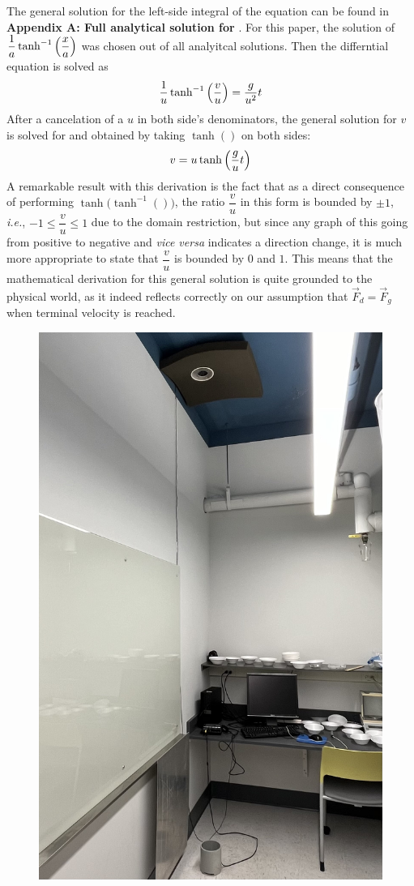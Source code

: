 \documentclass[12pt]{article}
\newcommand{\diff}[1]{\text{d}#1}
\newcommand{\dragforce}{\vec{F}_d}
\newcommand{\forceofgravity}{\vec{F}_g}
\newcommand{\inversetanh}{\tanh^{-1}}
\begin{document}
\begin{multicols}{2}
The general solution for the left-side integral of the equation can be found in \textbf{Appendix A: Full analytical solution for \bm{$\int\frac{1}{a^2-x^2}\diff{x}$}}.
For this paper, the solution of $\dfrac{1}{a}\inversetanh\qty(\dfrac{x}{a})$ was chosen out of all analyitcal solutions.
Then the differntial equation is solved as
$$\frac{1}{u}\inversetanh\qty(\frac{v}{u})=\frac{g}{u^2}t$$
After a cancelation of a $u$ in both side's denominators, the general solution for $v$ is solved for and obtained by taking $\tanh()$ on both sides:
$$v=u\tanh\qty(\frac{g}{u}t)$$
A remarkable result with this derivation is the fact that as a direct consequence of performing $\tanh\big(\inversetanh()\big)$,
the ratio $\dfrac{v}{u}$ in this form is bounded by $\pm1$, \textit{i.e.}, $-1\leq\dfrac{v}{u}\leq1$ due to the domain restriction,
but since any graph of this going from positive to negative and \textit{vice versa} indicates a direction change,
it is much more appropriate to state that $\dfrac{v}{u}$ is bounded by $0$ and $1$.
This means that the mathematical derivation for this general solution is quite grounded to the physical world,
as it indeed reflects correctly on our assumption that $\dragforce=\forceofgravity$ when terminal velocity is reached.
\begin{figure}[H]
    \centering
    \includegraphics[width=0.98\linewidth]{figs/figure2.jpg}

\end{figure}
\end{multicols}
\end{document}
